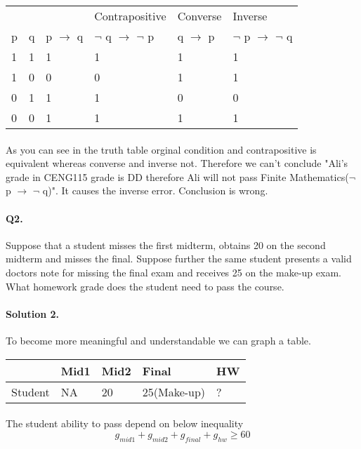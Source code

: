 \documentclass[11pt]{article}
\begin{document}
\begin{center}
\begin{tabular}{l|l|l|l|l|l}
\centering
& & & Contrapositive & Converse & Inverse \\
p & q & p $\rightarrow$ q & $\neg$ q $\rightarrow$ $\neg$ p & q $\rightarrow$ p & $\neg$ p $\rightarrow$ $\neg$ q \\
\hline
1 & 1 & 1 & 1 & 1 & 1\\
1 & 0 & 0 & 0 & 1 & 1\\
0 & 1 & 1 & 1 & 0 & 0\\
0 & 0 & 1 & 1 & 1 & 1\\
\end{tabular}
\end{center}


\paragraph{} As you can see in the truth table orginal condition and contrapositive is equivalent whereas converse and inverse not. Therefore we can't conclude "Ali's grade in CENG115 grade is DD therefore Ali will not pass Finite Mathematics($\neg$ p $\rightarrow$ $\neg$ q)". It causes the inverse error. Conclusion is wrong.
\\
\paragraph{Q2.} Suppose that a student misses the first midterm, obtains 20 on
the second midterm and misses the final. Suppose further the same student
presents a valid doctors note for missing the final exam and receives 25 on
the make-up exam. What homework grade does the student need to pass the
course.

\paragraph{Solution 2.}To become more meaningful and understandable we can graph a table.

\begin{center}
\begin{tabular}{l|l|l|l|l}
&Mid1&Mid2&Final&HW\\
\hline
Student&NA&20&25(Make-up)&?

\end{tabular}

\end{center}
\paragraph{}The student ability to pass depend on below inequality
\begin{equation}
g_{mid1} +  g_{mid2} + g_{final} + g_{hw} \geq 60
\end{equation}
\end{document}
